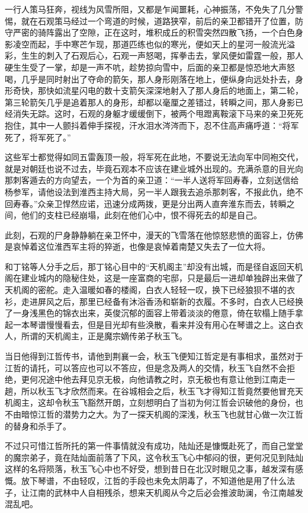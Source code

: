 一行人策马狂奔，视线为风雪所阻，又都是乍闻噩耗，心神振荡，不免失了几分警惕，就在石观策马经过一个弯道的时候，道路狭窄，前后的亲卫都错开了位置，防守严密的骑阵露出了空隙，正在这时，堆积成丘的积雪突然四散飞扬，一个白色身影凌空而起，手中寒芒乍现，那道匹练也似的寒光，便如天上的星河一般流光溢彩，生生的刺入了石观后心，石观一声怒喝，挥拳击去，掌风便如雷霆一般，那人硬生生受了一掌，却是一声不吭，趁势掠向雪中，后面的亲卫都是惊恐地大声怒喝，几乎是同时射出了夺命的箭矢，那人身形刚落在地上，便纵身向远处扑去，身形奇快，那快如流星闪电的数十支箭矢深深地射入了那人身后的地面上，第二轮，第三轮箭矢几乎是追着那人的身形，却都以毫厘之差错过，转瞬之间，那人身影已经消失无踪。这时，石观的身躯才缓缓倒下，被两个甩蹬离鞍滚下马来的亲卫死死抱住，其中一人颤抖着伸手探视，汗水泪水涔涔而下，忍不住高声痛呼道：“将军死了，将军死了。”

这些军士都觉得如同五雷轰顶一般，将军死在此地，不要说无法向军中同袍交代，就是对朝廷也说不过去，毕竟石观本不应该在建业城外出现的。充满杀意的目光向那刺客遁去的方向望去，一个为首的亲卫道：“一半人送将军回寿春，立刻送信给杨参军，请他设法到淮西主持大局，另一半人跟我去追杀那刺客，不报此仇，绝不回寿春。”众亲卫悍然应诺，迅速分成两拨，更是分出两人直奔淮东而去，转瞬之间，他们的支柱已经崩塌，此刻在他们心中，恨不得死去的却是自己。

此刻，石观的尸身静静躺在亲卫怀中，漫天的飞雪落在他惊怒悲愤的面容上，仿佛是哀悼着这位淮西军主将的猝逝，也像是哀悼着南楚又失去了一位大将。

和丁铭等人分手之后，那丁铭心目中的“天机阁主”却没有出城，而是径自返回天机阁在建业城内的隐秘住处，这是一座富商的宅邸，只是最后一进却单独辟出来做了天机阁的密舵。走入温暖如春的楼阁，白衣人轻轻一叹，换下已经狼狈不堪的衣衫，走进屏风之后，那里已经备有沐浴香汤和崭新的衣履。不多时，白衣人已经换了一身浅黑色的锦衣出来，英俊沉郁的面容上带着淡淡的倦意，倚在软榻上随手拿起一本琴谱慢慢看去，但是目光却有些涣散，看来并没有用心在琴谱之上。这白衣人，所谓的天机阁主，正是魔宗嫡传弟子秋玉飞。

当日他得到江哲传书，请他到荆襄一会，秋玉飞便知江哲定是有事相求，虽然对于江哲的请托，可以答应也可以不答应，但是念及两人的交情，秋玉飞自然不会拒绝，更何况途中他去拜见京无极，向他请教之时，京无极也有意让他到江南走一趟，所以秋玉飞才欣然而来。在谷城相会之后，秋玉飞才得知江哲竟然要他冒充天机阁主，这却令秋玉飞豁然开朗，立刻想明白了当初为何江哲会识破他的身份，也不由暗惊江哲的潜势力之大。为了一探天机阁的深浅，秋玉飞也就甘心做一次江哲的替身和杀手了。

不过只可惜江哲所托的第一件事情就没有成功，陆灿还是慷慨赴死了，而自己堂堂的魔宗弟子，竟在陆灿面前落了下风，这令秋玉飞心中郁闷的很，更何况见到陆灿这样的名将陨落，秋玉飞心中也不好受，想到昔日在北汉时眼见之事，越发深有感慨。放下琴谱，不由轻叹，江哲的手段也未免太阴毒了，不知道他是用了什么法子，让江南的武林中人自相残杀，想来天机阁从今之后必会推波助澜，令江南越发混乱吧。

